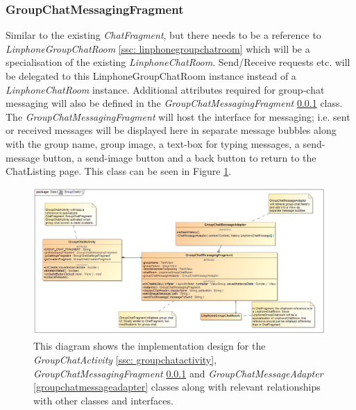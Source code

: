 \documentclass[11pt]{article}
\begin{document}
\subsubsection{GroupChatMessagingFragment}\label{groupchatmessagingfragment}
Similar to the existing \textit{ChatFragment}, but there needs to be a reference to \textit{LinphoneGroupChatRoom} \ref{ssc: linphonegroupchatroom} which will be a specialisation of the existing \textit{LinphoneChatRoom}. Send/Receive requests etc. will be delegated to this LinphoneGroupChatRoom instance instead of a \textit{LinphoneChatRoom} instance. Additional attributes required for group-chat messaging will also be defined in the \textit{GroupChatMessagingFragment} \ref{groupchatmessagingfragment} class. 
The \textit{GroupChatMessagingFragment} will host the interface for messaging; i.e. sent or received messages will be displayed here in separate message bubbles along with the group name, group image, a text-box for typing messages, a send-message button, a send-image button and a back button to return to the ChatListing page.
This class can be seen in Figure \ref{cd-group-chat-messaging-ui}.
\begin{figure}[H]
\centering
\centerline{\includegraphics[width=7in]{./images/class_group_chat_messaging_ui.png}}
\caption[Android Group Chat Messaging UI Class Diagram]{This diagram shows the implementation design for the \textit{GroupChatActivity} \ref{ssc: groupchatactivity}, \textit{GroupChatMessagingFragment} \ref{groupchatmessagingfragment} and \textit{GroupChatMessageAdapter} \ref{groupchatmessageadapter} classes along with relevant relationships with other classes and interfaces.}
\label{cd-group-chat-messaging-ui}
\end{figure}
\end{document}
